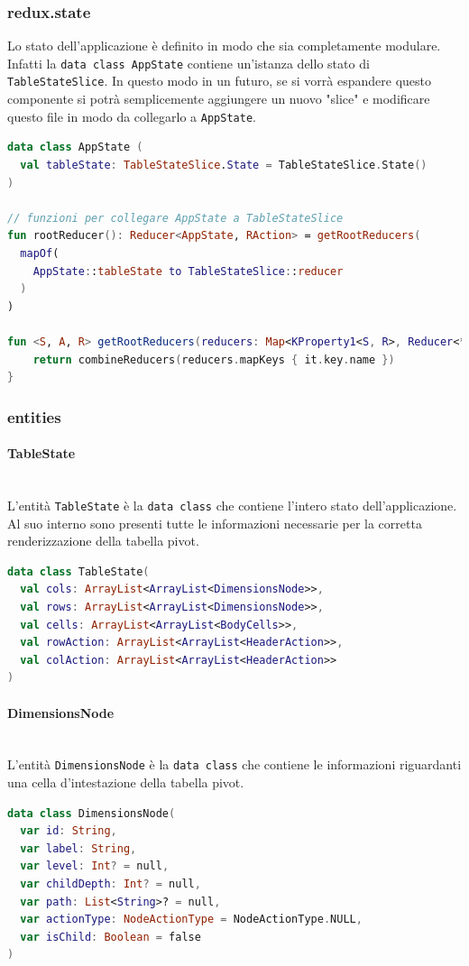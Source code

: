 \subsubsection{redux.state}
Lo stato dell'applicazione è definito in modo che sia completamente modulare. Infatti la \verb|data class AppState| contiene un'istanza dello stato di \verb|TableStateSlice|. In questo modo in un futuro, se si vorrà espandere questo componente si potrà semplicemente aggiungere un nuovo "slice" e modificare questo file in modo da collegarlo a \verb|AppState|.
\begin{lstlisting}[caption={TableState}, label={lst:tablestate}, language=Kotlin]
data class AppState (
  val tableState: TableStateSlice.State = TableStateSlice.State()
)

// funzioni per collegare AppState a TableStateSlice
fun rootReducer(): Reducer<AppState, RAction> = getRootReducers(
  mapOf(
    AppState::tableState to TableStateSlice::reducer
  )
)

fun <S, A, R> getRootReducers(reducers: Map<KProperty1<S, R>, Reducer<*, A>>): Reducer<S, A> {
	return combineReducers(reducers.mapKeys { it.key.name })
}
\end{lstlisting}

\subsubsection{entities}
\paragraph*{TableState} \mbox{} \\
L'entità \verb|TableState| è la \verb|data class| che contiene l'intero stato dell'applicazione. Al suo interno sono presenti tutte le informazioni necessarie per la corretta renderizzazione della tabella pivot.
\begin{lstlisting}[caption={TableState}, label={lst:tablestate}, language=Kotlin]
data class TableState(
  val cols: ArrayList<ArrayList<DimensionsNode>>,
  val rows: ArrayList<ArrayList<DimensionsNode>>,
  val cells: ArrayList<ArrayList<BodyCells>>,
  val rowAction: ArrayList<ArrayList<HeaderAction>>,
  val colAction: ArrayList<ArrayList<HeaderAction>>
)
\end{lstlisting}

\paragraph*{DimensionsNode} \mbox{} \\
L'entità \verb|DimensionsNode| è la \verb|data class| che contiene le informazioni riguardanti una cella d'intestazione della tabella pivot.
\begin{lstlisting}[caption={DimensionsNode}, label={lst:dimensionsnode}, language=Kotlin]
data class DimensionsNode(
  var id: String,
  var label: String,
  var level: Int? = null,
  var childDepth: Int? = null,
  var path: List<String>? = null,
  var actionType: NodeActionType = NodeActionType.NULL,
  var isChild: Boolean = false
)
\end{lstlisting}

